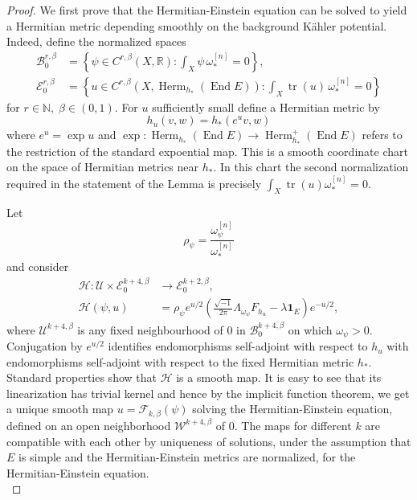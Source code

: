 \documentclass[10pt, letterpaper]{amsart}
\newcommand{\tr}{\operatorname{tr}}
\newcommand{\End}{\operatorname{End}}
\theoremstyle{plain}
\theoremstyle{definition}
\numberwithin{equation}{section}
\begin{document}
\begin{proof}
We first prove that the Hermitian-Einstein equation can be solved to yield a Hermitian metric depending smoothly on the background K\"ahler potential. Indeed, define the normalized spaces 
\begin{align*}
\mathcal B_0^{r,\beta}
&=
\left\{\psi\in C^{r,\beta}(X,\mathbb R):
\int_X\psi\,\omega_*^{[n]}=0\right\},\\
\mathcal E_0^{r,\beta}
&=
\left\{u\in C^{r,\beta}\left(X,\operatorname{Herm}_{h_*}(\End E)\right):
\int_X\tr(u)\,\omega_*^{[n]}=0\right\}
\end{align*}
for $r\in \mathbb{N},\;\beta\in (0,1)$. For $u$ sufficiently small define a Hermitian metric by
\[
h_u(v,w)=h_*\left(e^u v,w\right)
\]
where $e^u=\exp u$ and $\exp: \operatorname{Herm}_{h_*}(\End E)\rightarrow \operatorname{Herm}_{h_*}^+(\End E)$ refers to the restriction of the standard expoential map. This is a smooth coordinate chart on the space of Hermitian metrics near
$h_*$.  In this chart the second normalization required in the statement of the Lemma is precisely
$\int_X\tr(u)\omega_*^{[n]}=0$.

Let
\[
\rho_\psi=\frac{\omega_\psi^{[n]}}{\omega_*^{[n]}}
\]
and consider
\begin{align*}
\mathcal H:\mathcal U\times\mathcal E_0^{k+4,\beta}
&\longrightarrow \mathcal E_0^{k+2,\beta},\\
\mathcal H(\psi,u)
&=
\rho_\psi e^{u/2}
\left(
\frac{\sqrt{-1}}{2\pi}\Lambda_{\omega_\psi}F_{h_u}
-\lambda\mathbf 1_E
\right)e^{-u/2},
\end{align*}
where $\mathcal U^{k+4,\beta}$ is any fixed neighbourhood of $0$ in
$\mathcal B_0^{k+4,\beta}$ on which $\omega_\psi>0$.  Conjugation by
$e^{u/2}$ identifies endomorphisms self-adjoint with respect to $h_u$ with
endomorphisms self-adjoint with respect to the fixed Hermitian metric $h_*$. Standard properties show that $\mathcal H$ is a smooth map. It is easy to see that its linearization has trivial kernel and hence by the implicit function theorem, we get a unique smooth map $u=\mathcal F_{k,\beta}(\psi)$ solving the Hermitian-Einstein equation, defined on an open neighborhood $\mathcal{W}^{k+4,\beta}$ of $0$. The maps for different $k$ are compatible with each other by uniqueness of solutions, under the assumption that $E$ is simple and the Hermitian-Einstein metrics are normalized, for the Hermitian-Einstein equation.\\


\end{proof}
\end{document}
